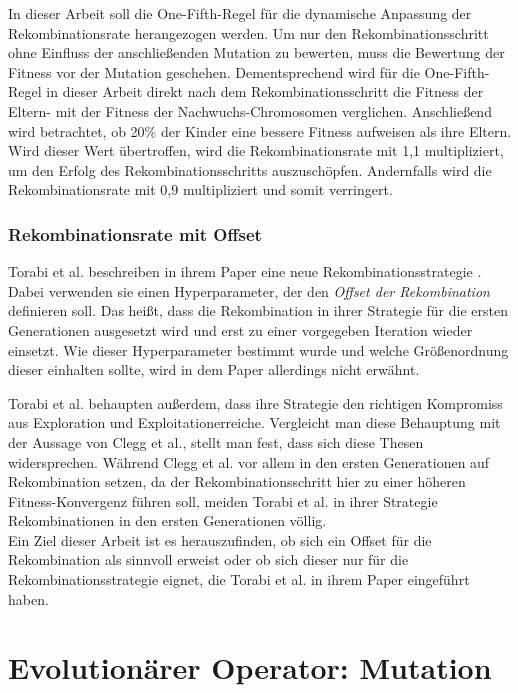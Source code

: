In dieser Arbeit soll die One-Fifth-Regel für die dynamische Anpassung der Rekombinationsrate herangezogen werden.
Um nur den Rekombinationsschritt ohne Einfluss der anschließenden Mutation zu bewerten, muss die Bewertung der Fitness vor der Mutation geschehen.
Dementsprechend wird für die One-Fifth-Regel in dieser Arbeit direkt nach dem Rekombinationsschritt die Fitness der Eltern- mit der Fitness der Nachwuchs-Chromosomen verglichen.
Anschließend wird betrachtet, ob 20\% der Kinder eine bessere Fitness aufweisen als ihre Eltern.
Wird dieser Wert übertroffen, wird die Rekombinationsrate mit 1,1 multipliziert, um den Erfolg des Rekombinationsschritts auszuschöpfen.
Andernfalls wird die Rekombinationsrate mit 0,9 multipliziert und somit verringert.


\subsubsection{Rekombinationsrate mit Offset}
\label{subsubsec:offsetCrossover}
Torabi et al. beschreiben in ihrem Paper eine neue Rekombinationsstrategie \cite{torabi_using_2022}.
Dabei verwenden sie einen Hyperparameter, der den \emph{Offset der Rekombination} definieren soll.
Das heißt, dass die Rekombination in ihrer Strategie für die ersten Generationen ausgesetzt wird und erst zu einer vorgegeben Iteration wieder einsetzt.
Wie dieser Hyperparameter bestimmt wurde und welche Größenordnung dieser einhalten sollte, wird in dem Paper allerdings nicht erwähnt.

Torabi et al. behaupten außerdem, dass ihre Strategie \glqq den richtigen Kompromiss aus Exploration und Exploitation\grqq\space erreiche. \cite{torabi_using_2022}
Vergleicht man diese Behauptung mit der Aussage von Clegg et al., stellt man fest, dass sich diese Thesen widersprechen.
Während Clegg et al. vor allem in den ersten Generationen auf Rekombination setzen, da der Rekombinationsschritt hier zu einer höheren Fitness-Konvergenz führen soll, meiden Torabi et al. in ihrer Strategie Rekombinationen in den ersten Generationen völlig. \cite{clegg_new_2007}\\
Ein Ziel dieser Arbeit ist es herauszufinden, ob sich ein Offset für die Rekombination als sinnvoll erweist oder ob sich dieser nur für die Rekombinationsstrategie eignet, die Torabi et al. in ihrem Paper eingeführt haben.


\section{Evolutionärer Operator: Mutation}
\label{subsec:Mutation}

